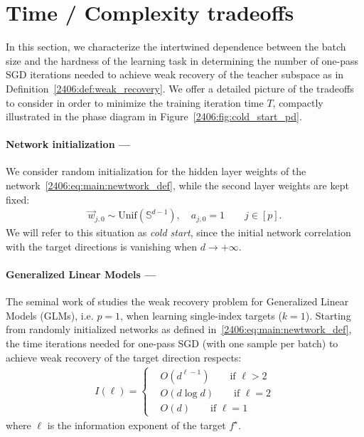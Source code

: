 \section{Time / Complexity tradeoffs}
\label{2406:sec:main:cold_start}
In this section, we characterize the intertwined dependence between the batch size and the hardness of the learning task in determining the number of one-pass SGD iterations needed to achieve weak recovery of the teacher subspace as in Definition~\ref{2406:def:weak_recovery}. We offer a detailed picture of the tradeoffs to consider in order to minimize the training iteration time $T$, compactly illustrated in the phase diagram in Figure~\ref{2406:fig:cold_start_pd}.


\paragraph{Network initialization ---}
We consider random initialization for the hidden layer weights of the network~\eqref{2406:eq:main:newtwork_def}, while the second layer weights are kept fixed:
\begin{align}\label{2406:eq:initial_conditions_unconstrainted}
    \vec w_{j,0}\sim \mathrm{Unif}(\mathbb{S}^{d-1}),\quad a_{j,0} = 1 \qquad j \in [p].
\end{align}
We will refer to this situation as \emph{cold start}, since the initial network correlation with the target directions is vanishing when \(d\to+\infty\). 

\paragraph{Generalized Linear Models ---}
The seminal work of \cite{arous2021online} studies the weak recovery problem for Generalized Linear Models (GLMs), i.e. $p=1$, when learning single-index targets ($k=1$). Starting from randomly initialized networks as defined in~\eqref{2406:eq:main:newtwork_def}, the time iterations needed for one-pass SGD (with one sample per batch) to achieve weak recovery of the target direction respects:
\begin{align}
\label{2406:eq:main:time_complexity_single_index}
    I(\ell) =
    \begin{cases}
        &O(d^{\ell -1} ) \qquad \text{if $\ell>2$} \\
        &O(d \log{d} ) \qquad \text{if $\ell=2$} \\
        &O(d) \qquad \text{if $\ell=1$}
    \end{cases}
\end{align}
where $\ell$ is the information exponent of the target $f^\star$.

